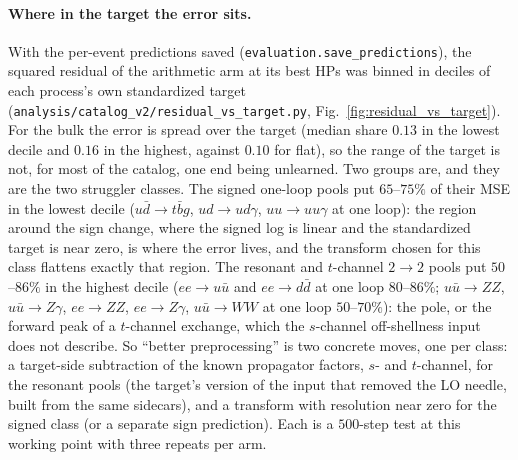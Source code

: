 \documentclass[11pt]{article}
\newcommand{\code}[1]{\texttt{#1}}
\begin{document}
\paragraph{Where in the target the error sits.} With the per-event predictions saved
(\code{evaluation.save\_predictions}), the squared residual of the arithmetic arm at its best
HPs was binned in deciles of each process's own standardized target
(\code{analysis/catalog\_v2/residual\_vs\_target.py}, Fig.~\ref{fig:residual_vs_target}). For
the bulk the error is spread over the target (median share $0.13$ in the lowest decile and
$0.16$ in the highest, against $0.10$ for flat), so the range of the target is not, for
most of the catalog, one end being unlearned. Two groups are, and they are the two
struggler classes. The signed one-loop pools put $65$--$75\%$ of their MSE in the lowest
decile ($u\bar d\to t\bar bg$, $ud\to ud\gamma$, $uu\to uu\gamma$ at one loop): the region
around the sign change, where the signed log is linear and the standardized target is near
zero, is where the error lives, and the transform chosen for this class flattens exactly
that region. The resonant and $t$-channel $2\to2$ pools put $50$--$86\%$ in the highest
decile ($ee\to u\bar u$ and $ee\to d\bar d$ at one loop $80$--$86\%$; $u\bar u\to ZZ$,
$u\bar u\to Z\gamma$, $ee\to ZZ$, $ee\to Z\gamma$, $u\bar u\to WW$ at one loop $50$--$70\%$):
the pole, or the forward peak of a $t$-channel exchange, which the $s$-channel off-shellness
input does not describe. So ``better preprocessing'' is two concrete moves, one per
class: a target-side subtraction of the known propagator factors, $s$- and $t$-channel,
for the resonant pools (the target's version of the input that removed the LO needle,
built from the same sidecars), and a transform with resolution near zero for the signed
class (or a separate sign prediction). Each is a $500$-step test at this working point with
three repeats per arm.
\end{document}
